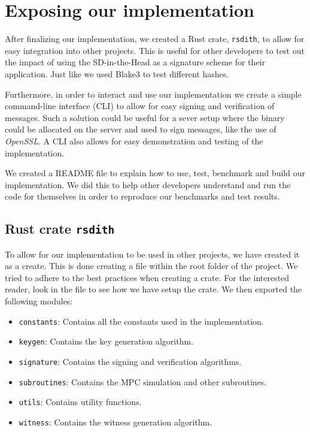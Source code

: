 \documentclass[11pt]{report}
\theoremstyle{definition}
\theoremstyle{plain}
\begin{document}
\section{Exposing our implementation}
After finalizing our implementation, we created a Rust crate, \texttt{rsdith}, to allow for easy integration into other projects. This is useful for other developers to test out the impact of using the SD-in-the-Head as a signature scheme for their application. Just like we used Blake3 to test different hashes.

Furthermore, in order to interact and use our implementation we create a simple command-line interface (CLI) to allow for easy signing and verification of messages. Such a solution could be useful for a sever setup where the binary could be allocated on the server and used to sign messages, like the use of \textit{OpenSSL}. A CLI also allows for easy demonstration and testing of the implementation.

We created a README file to explain how to use, test, benchmark and build our implementation. We did this to help other developers understand and run the code for themselves in order to reproduce our benchmarks and test results.

\subsection{Rust crate \texttt{rsdith}}
To allow for our implementation to be used in other projects, we have created it as a create. This is done creating a  file within the root folder of the project. We tried to adhere to the best practices when creating a crate. For the interested reader, look in the  file to see how we have setup the crate.
We then exported the following modules:
\begin{itemize}
  \item \texttt{constants}: Contains all the constants used in the implementation.
  \item \texttt{keygen}: Contains the key generation algorithm.
  \item \texttt{signature}: Contains the signing and verification algorithms.
  \item \texttt{subroutines}: Contains the MPC simulation and other subroutines.
  \item \texttt{utils}: Contains utility functions.
  \item \texttt{witness}: Contains the witness generation algorithm.
\end{itemize}
\end{document}
